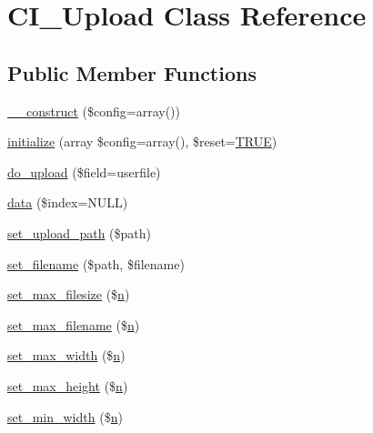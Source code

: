 \hypertarget{class_c_i___upload}{}\section{C\+I\+\_\+\+Upload Class Reference}
\label{class_c_i___upload}
\subsection*{Public Member Functions}
\begin{DoxyCompactItemize}
\item 
\mbox{\hyperlink{class_c_i___upload_af7f9493844d2d66e924e3c1df51ce616}{\+\_\+\+\_\+construct}} (\$config=array())
\item 
\mbox{\hyperlink{class_c_i___upload_a58cef448bae0c178f3f675700b7e4413}{initialize}} (array \$config=array(), \$reset=\mbox{\hyperlink{constants_8php_ae04a3efe6aa42044f803ee90c2277846}{T\+R\+UE}})
\item 
\mbox{\hyperlink{class_c_i___upload_a4cace770be6503a3563aae6cbb98086b}{do\+\_\+upload}} (\$field=\textquotesingle{}userfile\textquotesingle{})
\item 
\mbox{\hyperlink{class_c_i___upload_afe56c7645362202d2f1c7b8f7da67f39}{data}} (\$index=N\+U\+LL)
\item 
\mbox{\hyperlink{class_c_i___upload_ab2407f3a942d9b203f54e21194cf040d}{set\+\_\+upload\+\_\+path}} (\$path)
\item 
\mbox{\hyperlink{class_c_i___upload_a4b09b3f2b57a8bafcac1700f43d12c36}{set\+\_\+filename}} (\$path, \$filename)
\item 
\mbox{\hyperlink{class_c_i___upload_a1f78c3a54f32d313294b27cde4eafaf4}{set\+\_\+max\+\_\+filesize}} (\$\mbox{\hyperlink{cli_2error__php_8php_a2e6b16bbc42094e4c51ade3c10afdcf1}{n}})
\item 
\mbox{\hyperlink{class_c_i___upload_aa288c7337b534788b32d66b23e25548e}{set\+\_\+max\+\_\+filename}} (\$\mbox{\hyperlink{cli_2error__php_8php_a2e6b16bbc42094e4c51ade3c10afdcf1}{n}})
\item 
\mbox{\hyperlink{class_c_i___upload_a4028f187a825a666976cc3fe47cd44a8}{set\+\_\+max\+\_\+width}} (\$\mbox{\hyperlink{cli_2error__php_8php_a2e6b16bbc42094e4c51ade3c10afdcf1}{n}})
\item 
\mbox{\hyperlink{class_c_i___upload_aaed82d431f5aeee6a0af294bc604a51e}{set\+\_\+max\+\_\+height}} (\$\mbox{\hyperlink{cli_2error__php_8php_a2e6b16bbc42094e4c51ade3c10afdcf1}{n}})
\item 
\mbox{\hyperlink{class_c_i___upload_afe47751e024dc9bf07333060628e0fb4}{set\+\_\+min\+\_\+width}} (\$\mbox{\hyperlink{cli_2error__php_8php_a2e6b16bbc42094e4c51ade3c10afdcf1}{n}})

\end{DoxyCompactItemize}
